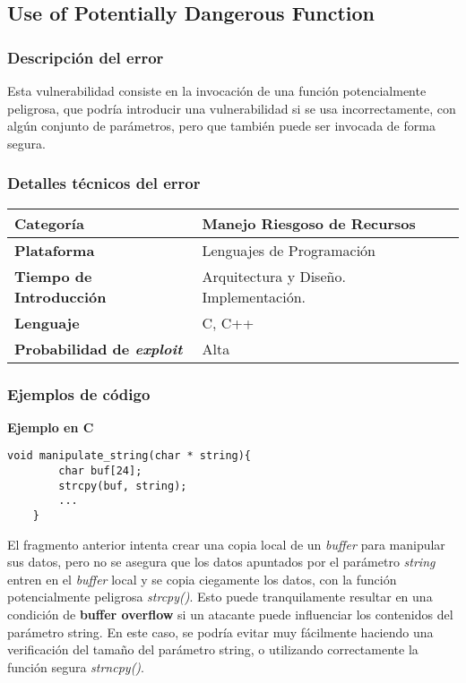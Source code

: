 \subsection{Use of Potentially Dangerous Function}

\subsubsection{Descripción del error}

Esta vulnerabilidad consiste en la invocación de una función potencialmente peligrosa, que podría introducir una vulnerabilidad si se usa incorrectamente, 
con algún conjunto de parámetros, pero que también puede ser invocada de forma segura.

\subsubsection{Detalles técnicos del error}
\begin{tabular}[\baselineskip]{|l|p{7cm}|}
  \hline
  \textbf{Categoría} & Manejo Riesgoso de Recursos \\
  \hline
  \textbf{Plataforma} & Lenguajes de Programación \\
  \hline
  \textbf{Tiempo de Introducción} & Arquitectura y Diseño. Implementación. \\
  \hline
  \textbf{Lenguaje} & C, C++ \\
  \hline
  \textbf{Probabilidad de \emph{exploit}} & Alta \\
  \hline
\end{tabular}

\subsubsection{Ejemplos de código}
\noindent \textbf{Ejemplo en C}\\

\begin{lstlisting}[frame=single]
    void manipulate_string(char * string){
        char buf[24];
        strcpy(buf, string);
        ...
    }
\end{lstlisting}

El fragmento anterior intenta crear una copia local de un \textit{buffer} para manipular sus datos, pero no se asegura que los datos apuntados por el parámetro \textit{string} entren en el
\textit{buffer} local y se copia ciegamente los datos, con la función potencialmente peligrosa \textit{strcpy()}. Esto puede tranquilamente resultar en una condición de \textbf{buffer overflow}
si un atacante puede influenciar los contenidos del parámetro string.
En este caso, se podría evitar muy fácilmente haciendo una verificación del tamaño del parámetro string, o utilizando correctamente la función segura \textit{strncpy()}.


